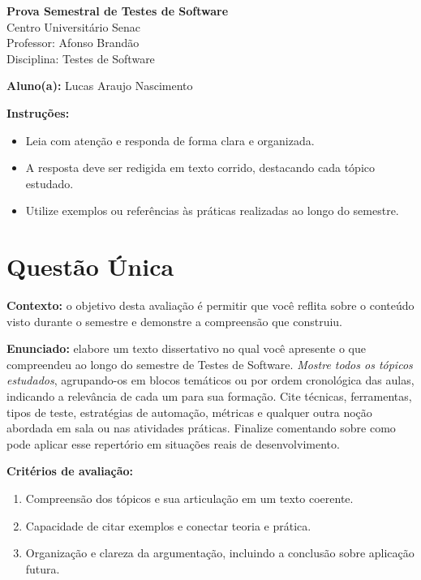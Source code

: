 \documentclass[12pt]{article}
\begin{document}
\newpage


\begin{center}
  {\Large \textbf{Prova Semestral de Testes de Software}}\\
  Centro Universitário Senac\\
  Professor: Afonso Brandão\\
  Disciplina: Testes de Software
\end{center}

\vspace{0.4cm}

\begin{center}
  \textbf{Aluno(a):} Lucas Araujo Nascimento
\end{center}

\vspace{0.5cm}

\begin{center}
  \textbf{Instruções:}
\end{center}
\begin{itemize}[leftmargin=*]
  \item Leia com atenção e responda de forma clara e organizada.
  \item A resposta deve ser redigida em texto corrido, destacando cada tópico estudado.
  \item Utilize exemplos ou referências às práticas realizadas ao longo do semestre.
\end{itemize}

\section*{Questão Única}
\textbf{Contexto:} o objetivo desta avaliação é permitir que você reflita sobre o conteúdo visto durante o semestre e demonstre a compreensão que construiu.

\textbf{Enunciado:} elabore um texto dissertativo no qual você apresente o que compreendeu ao longo do semestre de Testes de Software. \textit{Mostre todos os tópicos estudados}, agrupando-os em blocos temáticos ou por ordem cronológica das aulas, indicando a relevância de cada um para sua formação. Cite técnicas, ferramentas, tipos de teste, estratégias de automação, métricas e qualquer outra noção abordada em sala ou nas atividades práticas. Finalize comentando sobre como pode aplicar esse repertório em situações reais de desenvolvimento.

\textbf{Critérios de avaliação:}
\begin{enumerate}[label=\arabic*.]
  \item Compreensão dos tópicos e sua articulação em um texto coerente.
  \item Capacidade de citar exemplos e conectar teoria e prática.
  \item Organização e clareza da argumentação, incluindo a conclusão sobre aplicação futura.
\end{enumerate}
\end{document}
